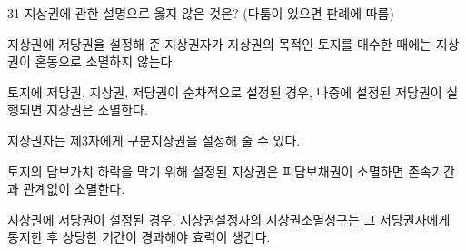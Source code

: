 \begin{question}{31}
지상권에 관한 설명으로 옳지 않은 것은? (다툼이 있으면 판례에 따름)
\begin{choices}
  \item 지상권에 저당권을 설정해 준 지상권자가 지상권의 목적인 토지를 매수한 때에는 지상권이 혼동으로 소멸하지 않는다.
  \item 토지에 저당권, 지상권, 저당권이 순차적으로 설정된 경우, 나중에 설정된 저당권이 실행되면 지상권은 소멸한다.
  \item 지상권자는 제3자에게 구분지상권을 설정해 줄 수 있다.
  \item 토지의 담보가치 하락을 막기 위해 설정된 지상권은 피담보채권이 소멸하면 존속기간과 관계없이 소멸한다.
  \item 지상권에 저당권이 설정된 경우, 지상권설정자의 지상권소멸청구는 그 저당권자에게 통지한 후 상당한 기간이 경과해야 효력이 생긴다.
\end{choices}
\end{question}
